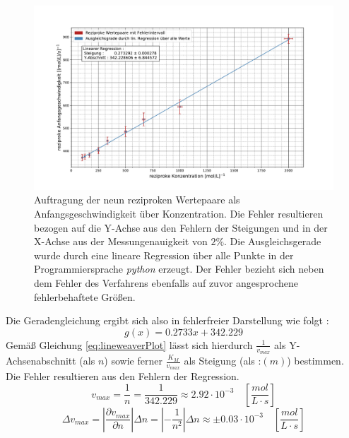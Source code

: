 \begin{figure}[H]
	\centering	
	\begin{minipage}{1\textwidth}
		\includegraphics[width=\columnwidth]{Bilder/Lineweaver.pdf}
	\end{minipage}
	\caption{Auftragung der neun reziproken Wertepaare als Anfangsgeschwindigkeit über Konzentration. Die Fehler resultieren bezogen auf die Y-Achse aus den Fehlern der Steigungen und in der X-Achse aus der Messungenauigkeit von $2\%$. Die Ausgleichsgerade wurde durch eine lineare Regression über alle Punkte in der Programmiersprache \textit{python} erzeugt. Der Fehler bezieht sich neben dem Fehler des Verfahrens ebenfalls auf zuvor angesprochene fehlerbehaftete Größen.}
	\label{Lineweaver}
\end{figure}
Die Geradengleichung ergibt sich also in fehlerfreier Darstellung wie folgt : 
\begin{equation}
g(x) = 0.2733 x + 342.229
\label{Geradengleichung}
\end{equation}
Gemäß Gleichung \ref{eq:lineweaverPlot} lässt sich hierdurch $\frac{1}{v_{max}}$ als Y-Achsenabschnitt (als $n$) sowie ferner $\frac{K_M}{v_{max}}$ als Steigung (als :$(m)$) bestimmen. Die Fehler resultieren aus den Fehlern der Regression.\\
\begin{equation}
v_{max} = \frac{1}{n} = \frac{1}{342.229} \approx 2.92\cdot 10^{-3} \quad \left[\si{\frac{mol}{L\cdot s}}\right]
\end{equation}
\begin{equation}
\Delta v_{max} = |\frac{\partial v_{max}}{\partial n}|\Delta n = |-\frac{1}{n^2}|\Delta n \approx \pm 0.03  \cdot 10^{-3}\quad \left[\si{\frac{mol}{L\cdot s}}\right]
\end{equation}
